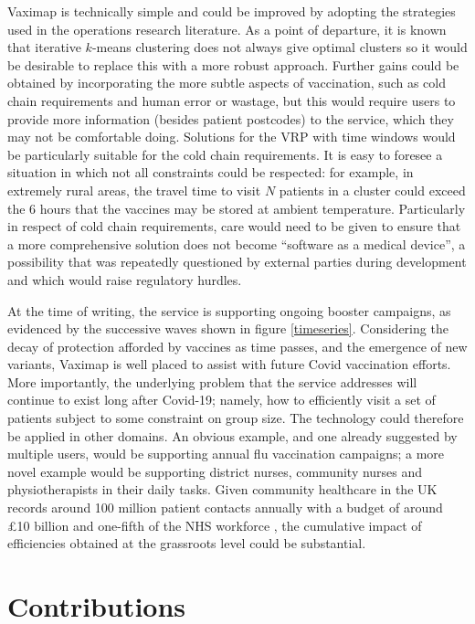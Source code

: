 \documentclass{article}
\def\vm{Vaximap}
\begin{document}
\vm{} is technically simple and could be improved by adopting the strategies used in the operations research literature. As a point of departure, it is known that iterative $k$-means clustering does not always give optimal clusters so it would be desirable to replace this with a more robust approach. Further gains could be obtained by incorporating the more subtle aspects of vaccination, such as cold chain requirements and human error or wastage, but this would require users to provide more information (besides patient postcodes) to the service, which they may not be comfortable doing. Solutions for the VRP with time windows would be particularly suitable for the cold chain requirements. It is easy to foresee a situation in which not all constraints could be respected: for example, in extremely rural areas, the travel time to visit $N$ patients in a cluster could exceed the 6 hours that the vaccines may be stored at ambient temperature. Particularly in respect of cold chain requirements, care would need to be given to ensure that a more comprehensive solution does not become ``software as a medical device'', a possibility that was repeatedly questioned by external parties during development and which would raise regulatory hurdles. 

At the time of writing, the service is supporting ongoing booster campaigns, as evidenced by the successive waves shown in figure \ref{timeseries}. Considering the decay of protection afforded by vaccines as time passes, and the emergence of new variants, \vm{} is well placed to assist with future Covid vaccination efforts. More importantly, the underlying problem that the service addresses will continue to exist long after Covid-19; namely, how to efficiently visit a set of patients subject to some constraint on group size. The technology could therefore be applied in other domains. An obvious example, and one already suggested by multiple users, would be supporting annual flu vaccination campaigns; a more novel example would be supporting district nurses, community nurses and physiotherapists in their daily tasks. Given community healthcare in the UK records around 100 million patient contacts annually with a budget of around £10 billion and one-fifth of the NHS workforce \cite{Fund2019}, the cumulative impact of efficiencies obtained at the grassroots level could be substantial. 

\section{Contributions}
\end{document}
